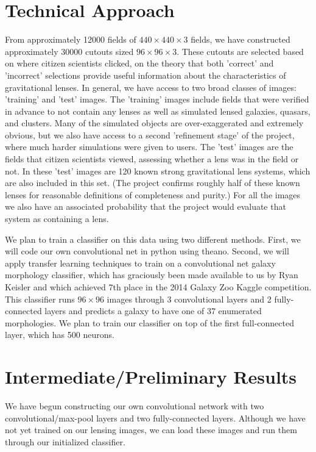 \documentclass[10pt,twocolumn,letterpaper]{article}
\begin{document}
\section{Technical Approach}

From approximately 12000 fields of $440\times440\times3$ fields, we have
constructed approximately 30000 cutouts sized $96\times96\times3$. These cutouts
are selected based on where citizen scientists clicked, on the theory that both
'correct' and 'incorrect' selections provide useful information about the
characteristics of gravitational lenses. In general, we have access to two
broad classes of images: 'training' and 'test' images. The 'training' images
include fields that were verified in advance to not contain any lenses as well
as simulated lensed galaxies, quasars, and clusters. Many of the simulated
objects are over-exaggerated and extremely obvious, but we also have access to
a second 'refinement stage' of the project, where much harder simulations were
given to users. The 'test' images are the fields that citizen scientists
viewed, assessing whether a lens was in the field or not. In these 'test'
images are 120 known strong gravitational lens systems, which are also included
in this set. (The project confirms roughly half of these known lenses for
reasonable definitions of completeness and purity.) For all the images we also
have an associated probability that the project would evaluate that system as
containing a lens.

We plan to train a classifier on this data using two different methods. First, we will code 
our own convolutional net in python using theano. Second, we will apply transfer learning 
techniques to train on a convolutional net galaxy morphology classifier, which has graciously 
been made available to us by Ryan Keisler and which achieved 7th place in the 2014 Galaxy 
Zoo Kaggle competition. This classifier runs $96\times96$ images through 3 convolutional 
layers and 2 fully-connected layers and predicts a galaxy to have one of 37 enumerated 
morphologies. We plan to train our classifier on top of the first full-connected layer, which 
has 500 neurons. 

\section{Intermediate/Preliminary Results}

We have begun constructing our own convolutional network with two convolutional/max-pool 
layers and two fully-connected layers. Although we have not yet trained on our lensing images,
we can load these images and run them through our initialized classifier.

% 
% 
\end{document}
